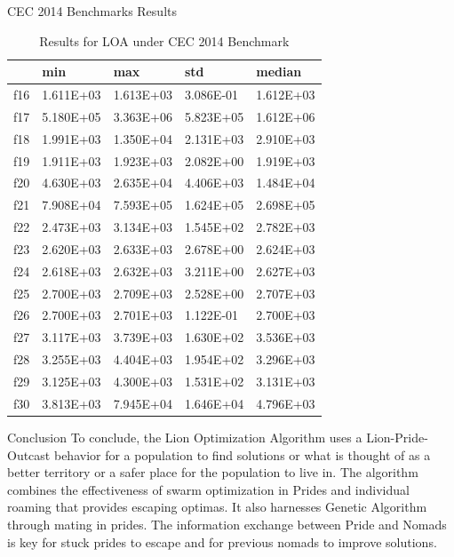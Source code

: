 \documentclass{beamer}
\begin{document}
\begin{frame}{CEC 2014 Benchmarks Results}
\begin{table}[]
\begin{tabular}{lllll}
    & \textbf{min}       & \textbf{max}       & \textbf{std}       & \textbf{median}    \\ \hline
f16 & 1.611E+03 & 1.613E+03 & 3.086E-01 & 1.612E+03 \\
f17 & 5.180E+05 & 3.363E+06 & 5.823E+05 & 1.612E+06 \\
f18 & 1.991E+03 & 1.350E+04 & 2.131E+03 & 2.910E+03 \\
f19 & 1.911E+03 & 1.923E+03 & 2.082E+00 & 1.919E+03 \\
f20 & 4.630E+03 & 2.635E+04 & 4.406E+03 & 1.484E+04 \\
f21 & 7.908E+04 & 7.593E+05 & 1.624E+05 & 2.698E+05 \\
f22 & 2.473E+03 & 3.134E+03 & 1.545E+02 & 2.782E+03 \\
f23 & 2.620E+03 & 2.633E+03 & 2.678E+00 & 2.624E+03 \\
f24 & 2.618E+03 & 2.632E+03 & 3.211E+00 & 2.627E+03 \\
f25 & 2.700E+03 & 2.709E+03 & 2.528E+00 & 2.707E+03 \\
f26 & 2.700E+03 & 2.701E+03 & 1.122E-01 & 2.700E+03 \\
f27 & 3.117E+03 & 3.739E+03 & 1.630E+02 & 3.536E+03 \\
f28 & 3.255E+03 & 4.404E+03 & 1.954E+02 & 3.296E+03 \\
f29 & 3.125E+03 & 4.300E+03 & 1.531E+02 & 3.131E+03 \\
f30 & 3.813E+03 & 7.945E+04 & 1.646E+04 & 4.796E+03
\end{tabular}
\caption{Results for LOA under CEC 2014 Benchmark}
\end{table}
\end{frame}

\begin{frame}{Conclusion}
To conclude, the Lion Optimization Algorithm uses a Lion-Pride-Outcast behavior for a population to find solutions or what is thought of as a better territory or a safer place for the population to live in. The algorithm combines the effectiveness of swarm optimization in Prides and individual roaming that provides escaping optimas. It also harnesses Genetic Algorithm through mating in prides. The information exchange between Pride and Nomads is key for stuck prides to escape and for previous nomads to improve solutions.
\end{frame}
\end{document}

